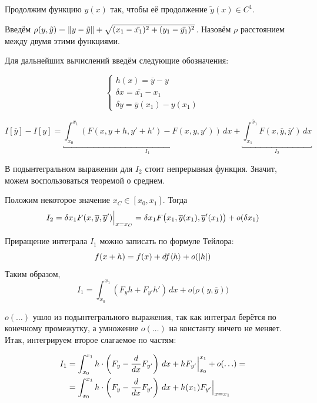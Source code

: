 \documentclass[12pt]{article}
\begin{document}
			Продолжим функцию $y(x)$ так, чтобы её продолжение $\tilde{y}(x) \in C^1$.
	
			Введём $\rho(y, \tilde{y}) = \left\| y - \tilde{y} \right\| + \sqrt{(x_1 - \bar{x_1})^2 + (y_1 - \bar{y_1})^2}$. Назовём $\rho$ расстоянием между двумя этими функциями.

			Для дальнейших вычислений введём следующие обозначения:
	
			$$
				\left\{
				\begin{aligned}
					h(x) = \overline{y} - y \\
					\delta x = \overline{x_1} - x_1 \\
					\delta y = \overline{y}(x_1) - y(x_1)
				\end{aligned}
				\right.
			$$

			$$I[\overline{y}] - I[y] = 
	  			\underbracket{\int_{x_0}^{x_1} (F(x, y + h, y' + h') - F(x, y, y')) \,dx}_{I_1} +
	  			\underbracket{\int_{x_1}^{\overline{x}_1} F(x, \overline{y}, \overline{y}') \,dx}_{I_2}$$
	  
			В подынтегральном выражении для $I_2$ стоит непрерывная функция. Значит, можем воспользоваться
			теоремой о среднем.
	
	
			Положим некоторое значение $x_C \in [x_0, x_1]$. Тогда 
			$$I_2 = \delta x_1 F(x, \overline{y}, \overline{y}')\Big|_{x = x_C}^{} 
			= \delta x_1 F\big(x_1, \overline{y}(x_1), \overline{y}'(x_1)\big) + o(\delta x_1)$$
	
			Приращение интеграла $I_1$ можно записать по формуле Тейлора:
			$$f(x + h) = f(x) + df\langle h \rangle + o(\left| h \right|)$$
			Таким образом, 
			$$I_1 = \int_{x_0}^{x_1} (F_yh + F_{y'}h') \,dx + o\big(\rho(y, \overline{y})\big)$$
	
			$o(\ldots)$ ушло из подынтегрального выражения, так как интеграл берётся по конечному промежутку,
			а умножение $o(\ldots)$ на константу ничего не меняет. Итак, интегрируем второе слагаемое по
			частям:
	
			\begin{align*}
				I_1 &= \int_{x_0}^{x_1} h\cdot\left(F_y - \frac{d}{dx}F_{y'}\right) \,dx + hF_{y'}\Big|_{x_0}^{x_1} + 
				o(\ldots) = \\
				&= \int_{x_0}^{x_1} h\cdot\left(F_y - \frac{d}{dx}F_{y'}\right) \,dx + h(x_1) F_{y'}\Big|_{x = x_1}^{}
			\end{align*}
\end{document}
